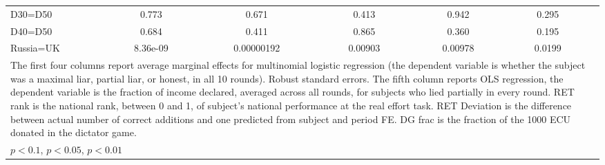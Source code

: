 \begin{tabular}{l|cccccccc|cc}
D30=D50         &    0.773         &         &    0.671         &         &    0.413         &         &    0.942         &         &    0.295         &         \\
D40=D50         &    0.684         &         &    0.411         &         &    0.865         &         &    0.360         &         &    0.195         &         \\
Russia=UK       & 8.36e-09         &         &0.00000192         &         &  0.00903         &         &  0.00978         &         &   0.0199         &         \\
\hline\hline
\multicolumn{11}{p{16.5cm}}{\tiny The first four columns report average marginal effects for multinomial logistic regression (the dependent variable is whether the subject was a maximal liar, partial liar, or honest, in all 10 rounds). Robust standard errors. The fifth column reports OLS regression, the dependent variable is the fraction of income declared, averaged across all rounds, for subjects who lied partially in every round. RET rank is the national rank, between 0 and 1, of subject's national performance at the real effort task. RET Deviation is the difference between actual number of correct additions and one predicted from subject and period FE. DG frac is the fraction of the 1000 ECU donated in the dictator game.}\\
\multicolumn{11}{l}{\tiny \sym{*} \(p<0.1\), \sym{**} \(p<0.05\), \sym{***} \(p<0.01\)}\\
\end{tabular}